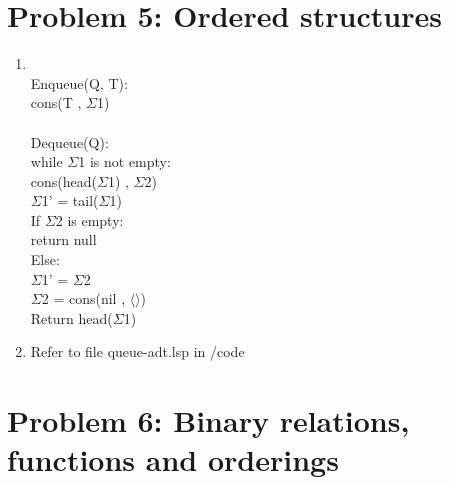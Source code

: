 \documentclass[12pt]{article}
\begin{document}
\section*{Problem 5: Ordered structures}
\begin{enumerate}
	\item 
	
	\begin{tabbing}
		\hspace{0.5pt}\=
		\\ %
		\>Enqueue(Q, T): \hspace{0.5pt}\=\\
		\>\> cons(T , $\Sigma$1) \\
		\\
		\>Dequeue(Q): \\
		\>\> while $\Sigma$1 is not empty:\hspace{0.5pt}\= \\
		\>\>\> cons(head($\Sigma$1) , $\Sigma$2) \\
		\>\> $\Sigma$1’ = tail($\Sigma$1) \\
		\>\> If $\Sigma$2 is empty: \\
		\>\>\> return null \\
		\>\> Else: \\
		\>\>\> $\Sigma$1’ = $\Sigma$2 \\
		\>\>\> $\Sigma$2 = cons(nil , $\langle \rangle$) \\
		\>\>\> Return head($\Sigma$1)
	\end{tabbing}
	
	\item Refer to file queue-adt.lsp in /code
\end{enumerate}
\section*{Problem 6: Binary relations, functions and orderings}
\end{document}
